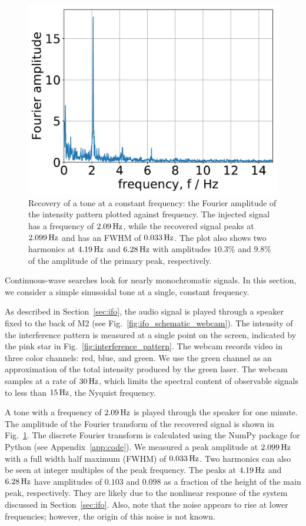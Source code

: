 \documentclass[paper-main.tex]{subfiles}
\begin{document}
\begin{figure}
	\includegraphics[width=.5\textwidth]{figures/webcam_spectrum_expt_4_0209.pdf}
	\caption{\label{fig:webcam_spectrum}
Recovery of a tone at a constant frequency: the Fourier amplitude of the intensity pattern plotted against frequency.
The injected signal has a frequency of $2.09\,{\rm Hz}$, while the recovered signal peaks at $2.099\,{\rm Hz}$ and has an FWHM of $0.033\,{\rm Hz}$.
The plot also shows two harmonics at $4.19\,{\rm Hz}$ and $6.28\,{\rm Hz}$ with amplitudes $10.3 \%$ and $9.8 \%$ of the amplitude of the primary peak, respectively.
}	
\end{figure}


Continuous-wave searches look for nearly monochromatic signals.\cite{JKS:1998} 
In this section, we consider a simple sinusoidal tone at a single, constant frequency. 


As described in Section~\ref{sec:ifo}, the audio signal is played through a speaker fixed to the back of M2 (see Fig.~\ref{fig:ifo_schematic_webcam}). 
The intensity of the interference pattern is measured at a single point on the screen, indicated by the pink star in Fig.~\ref{fig:interference_pattern}. 
The webcam records video in three color channels: red, blue, and green. 
We use the green channel as an approximation of the total intensity produced by the green laser.
The webcam samples at a rate of $30\, {\rm Hz}$, which limits the spectral content of observable signals to less than $15\,{\rm Hz}$, the Nyquist frequency. 


A tone with a frequency of $2.09\,{\rm Hz}$ is played through the speaker for one minute. 
The amplitude of the Fourier transform of the recovered signal is shown in Fig.~\ref{fig:webcam_spectrum}. The discrete Fourier transform is calculated using the NumPy package for Python (see Appendix~\ref{app:code}).
We measured a peak amplitude at $2.099\,{\rm Hz}$ with a full width half maximum (FWHM) of $0.033\,{\rm Hz}$.
Two harmonics can also be seen at integer multiples of the peak frequency. 
The peaks at $4.19\,{\rm Hz}$ and $6.28\,{\rm Hz}$ have amplitudes of $0.103$ and $0.098$ as a fraction of the height of the main peak, respectively. They are likely due to the nonlinear response of the system discussed in Section~\ref{sec:ifo}.
Also, note that the noise appears to rise at lower frequencies; however, the origin of this noise is not known. 
\end{document}
